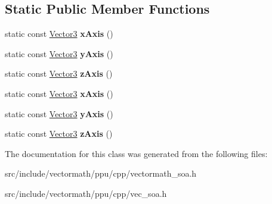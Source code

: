 \subsection*{Static Public Member Functions}
\begin{DoxyCompactItemize}
\item 
\hypertarget{classVectormath_1_1Soa_1_1Vector3_a73a285c366ee9d0ad110e62c87ad6d8d}{static const \hyperlink{classVectormath_1_1Soa_1_1Vector3}{Vector3} {\bfseries x\-Axis} ()}\label{classVectormath_1_1Soa_1_1Vector3_a73a285c366ee9d0ad110e62c87ad6d8d}

\item 
\hypertarget{classVectormath_1_1Soa_1_1Vector3_a16bb85c1f9c33861fa10ddc16ad85b85}{static const \hyperlink{classVectormath_1_1Soa_1_1Vector3}{Vector3} {\bfseries y\-Axis} ()}\label{classVectormath_1_1Soa_1_1Vector3_a16bb85c1f9c33861fa10ddc16ad85b85}

\item 
\hypertarget{classVectormath_1_1Soa_1_1Vector3_a161faad15f0e3a73b22c400f5edefc12}{static const \hyperlink{classVectormath_1_1Soa_1_1Vector3}{Vector3} {\bfseries z\-Axis} ()}\label{classVectormath_1_1Soa_1_1Vector3_a161faad15f0e3a73b22c400f5edefc12}

\item 
\hypertarget{classVectormath_1_1Soa_1_1Vector3_a152564d7413e60b5633d964512307628}{static const \hyperlink{classVectormath_1_1Soa_1_1Vector3}{Vector3} {\bfseries x\-Axis} ()}\label{classVectormath_1_1Soa_1_1Vector3_a152564d7413e60b5633d964512307628}

\item 
\hypertarget{classVectormath_1_1Soa_1_1Vector3_ad24024937de752e0468fc5487deaeae6}{static const \hyperlink{classVectormath_1_1Soa_1_1Vector3}{Vector3} {\bfseries y\-Axis} ()}\label{classVectormath_1_1Soa_1_1Vector3_ad24024937de752e0468fc5487deaeae6}

\item 
\hypertarget{classVectormath_1_1Soa_1_1Vector3_adbad8f188a7e8015e9f3a12bcd0c34fb}{static const \hyperlink{classVectormath_1_1Soa_1_1Vector3}{Vector3} {\bfseries z\-Axis} ()}\label{classVectormath_1_1Soa_1_1Vector3_adbad8f188a7e8015e9f3a12bcd0c34fb}

\end{DoxyCompactItemize}


The documentation for this class was generated from the following files\-:\begin{DoxyCompactItemize}
\item 
src/include/vectormath/ppu/cpp/vectormath\-\_\-soa.\-h\item 
src/include/vectormath/ppu/cpp/vec\-\_\-soa.\-h\end{DoxyCompactItemize}
